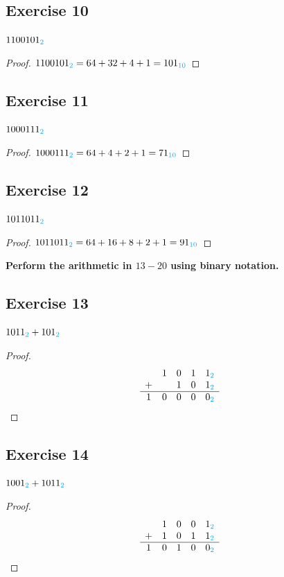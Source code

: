 \documentclass[14pt]{extarticle}
\newcommand{\base}[1]{{\color{cyan}#1}}
\begin{document}
\subsection{Exercise 10}
$1100101_\base{2}$

\begin{proof}
$1100101_\base{2} = 64 + 32 + 4 + 1 = 101_\base{10}$
\end{proof}

\subsection{Exercise 11}
$1000111_\base{2}$

\begin{proof}
$1000111_\base{2} = 64 + 4 + 2 + 1 = 71_\base{10}$
\end{proof}

\subsection{Exercise 12}
$1011011_\base{2}$

\begin{proof}
$1011011_\base{2} = 64 + 16 + 8 + 2 + 1 = 91_\base{10}$
\end{proof}

{\bf \color{cyan} Perform the arithmetic in $13-20$ using binary notation.}

\subsection{Exercise 13}
$1011_\base{2} + 101_\base{2}$

\begin{proof}
$$
\begin{array}{ccccc}
&1&0&1&1_\base{2}\\ +& &1&0&1_\base{2}\\
\hline
1&0&0&0&0_\base{2}\\
\end{array}
$$
\end{proof}

\subsection{Exercise 14}
$1001_\base{2} + 1011_\base{2}$

\begin{proof}
$$
\begin{array}{ccccc}
&1&0&0&1_\base{2}\\
+&1&0&1&1_\base{2}\\
\hline
1&0&1&0&0_\base{2}\\
\end{array}
$$
\end{proof}
\end{document}
